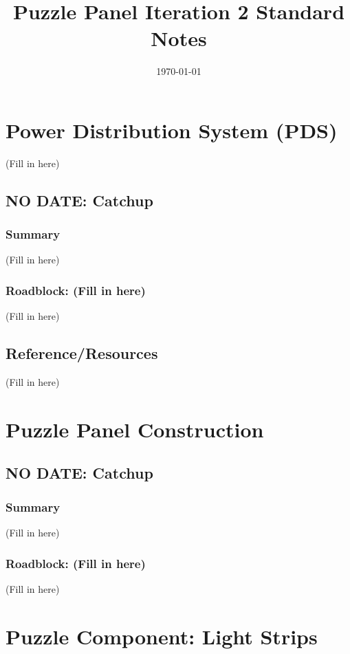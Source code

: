 \documentclass[a4paper, 10pt]{article}
\title{Puzzle Panel Iteration 2 Standard Notes}
\date{\today}
\begin{document}
\maketitle

\pagebreak

\tableofcontents

\pagebreak

\section{Power Distribution System (PDS)}
(Fill in here)

	\subsection{NO DATE: Catchup}
		\subsubsection{Summary}
		(Fill in here)
		
		
			
			\subsubsection{Roadblock: (Fill in here)}
			(Fill in here)
			
		\subsection{Reference/Resources}
		(Fill in here)
		
\section{Puzzle Panel Construction}
	\subsection{NO DATE: Catchup}
		\subsubsection{Summary}
		(Fill in here)
		
		\subsubsection{Roadblock: (Fill in here)}
		(Fill in here)
		
\section{Puzzle Component: Light Strips}
\end{document}

